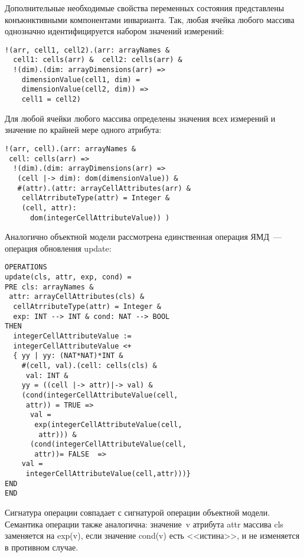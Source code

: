 \begin{multicols}{2}
        Дополнительные необходимые свойства переменных состояния 
представлены конъюнктивными компонентами инварианта. Так, любая ячейка 
любого массива однозначно идентифицируется набором значений измерений:
        \begin{verbatim}
!(arr, cell1, cell2).(arr: arrayNames & 
  cell1: cells(arr) &  cell2: cells(arr) &
  !(dim).(dim: arrayDimensions(arr) =>
    dimensionValue(cell1, dim) = 
    dimensionValue(cell2, dim)) =>
    cell1 = cell2)
        \end{verbatim}
        
                \vspace*{-6pt}
        
        Для любой ячейки любого массива определены значения всех измерений 
и значение по крайней мере одного атрибута:
        \begin{verbatim}
!(arr, cell).(arr: arrayNames & 
 cell: cells(arr) =>
  !(dim).(dim: arrayDimensions(arr) => 
   (cell |-> dim): dom(dimensionValue)) &
   #(attr).(attr: arrayCellAttributes(arr) & 
    cellAtrributeType(attr) = Integer & 
    (cell, attr): 
      dom(integerCellAttributeValue)) )
        \end{verbatim}
        
        \vspace*{-6pt}
        
        Аналогично объектной модели рассмотрена единственная операция 
ЯМД~--- операция об\-нов\-ле\-ния {\sf update}:
        \begin{verbatim}
OPERATIONS
update(cls, attr, exp, cond) =
PRE cls: arrayNames & 
 attr: arrayCellAttributes(cls) &
  cellAtrributeType(attr) = Integer &
  exp: INT --> INT & cond: NAT --> BOOL
THEN
  integerCellAttributeValue := 
  integerCellAttributeValue <+
  { yy | yy: (NAT*NAT)*INT &
    #(cell, val).(cell: cells(cls) & 
     val: INT & 
    yy = ((cell |-> attr)|-> val) &
    (cond(integerCellAttributeValue(cell, 
     attr)) = TRUE =>
      val = 
       exp(integerCellAttributeValue(cell,
        attr))) &
      (cond(integerCellAttributeValue(cell, 
       attr))= FALSE  =>
    val = 
     integerCellAttributeValue(cell,attr)))}
END   
END
        \end{verbatim}
        
                \vspace*{-6pt}
        
        Сигнатура операции совпадает с сигнатурой операции объектной 
модели. Семантика операции также аналогична: значение~{\sf v} атрибута {\sf attr} 
массива {\sf cls} заменяется на {\sf exp(v)}, если значение {\sf cond(v)} есть 
<<истина>>, и не изменяется в противном случае. 
        

\end{multicols}
